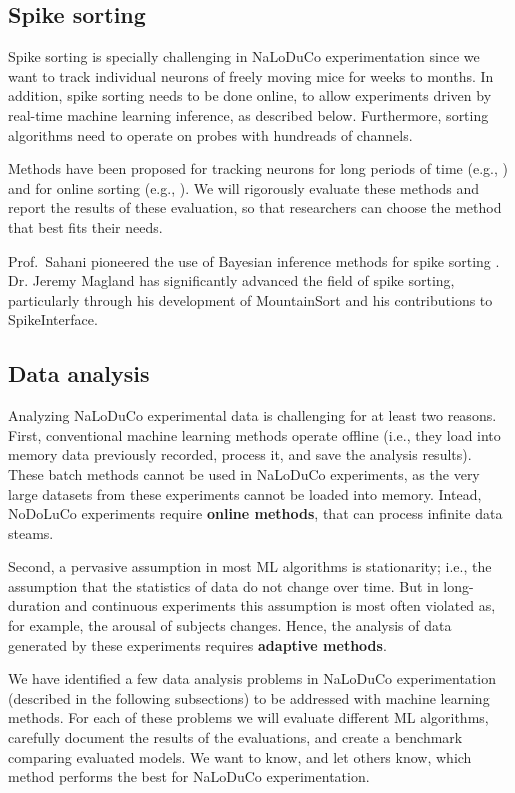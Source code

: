 \subsection{Spike sorting}

Spike sorting is specially challenging in NaLoDuCo experimentation since we
want to track individual neurons of freely moving mice for weeks to months.
%
In addition, spike sorting needs to be done online, to allow experiments driven
by real-time machine learning inference, as described below.
%
Furthermore, sorting algorithms need to operate on probes with hundreads of
channels.

Methods have been proposed for tracking neurons for long periods of time (e.g.,
\cite{yuanEtAl24,vanBeestEtAl24}) and for online sorting (e.g.,
\cite{rutishauserEtAl06,santhanamEtAl04}). We will rigorously evaluate these
methods and report the results of these evaluation, so that researchers can
choose the method that best fits their needs.

Prof.~Sahani pioneered the use of Bayesian inference methods for spike sorting
\cite{sahani99}. Dr. Jeremy Magland has significantly advanced the field of
spike sorting, particularly through his development of MountainSort
\cite{mountainSort5} and his contributions to
SpikeInterface\cite{spikeInterface}.

\subsection{Data analysis}

Analyzing NaLoDuCo experimental data is challenging for at least two reasons.
%
First, conventional machine learning methods operate offline (i.e., they load
into memory data previously recorded, process it, and save the analysis
results).
%
These batch methods cannot be used in NaLoDuCo experiments, as the very large
datasets from these experiments cannot be loaded into memory.
%
Intead, NoDoLuCo experiments require \textbf{online methods}, that can process
infinite data steams.

Second, a pervasive assumption in most ML algorithms is stationarity; i.e., the
assumption that the statistics of data do not change over time.
%
But in long-duration and continuous experiments this assumption is most often
violated as, for example, the arousal of subjects changes.
%
Hence, the analysis of data generated by these experiments requires
\textbf{adaptive methods}.

We have identified a few data analysis problems in NaLoDuCo experimentation
(described in the following subsections) to be addressed with machine learning
methods.
%
For each of these problems we will evaluate different ML algorithms, carefully
document the results of the evaluations, and create a benchmark comparing
evaluated models.
%
We want to know, and let others know, which method performs the best for
NaLoDuCo experimentation.


